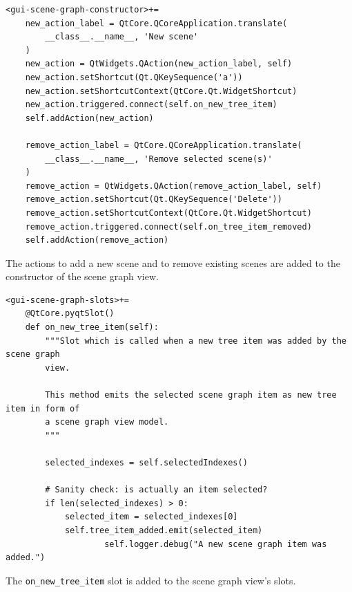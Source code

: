\documentclass[10pt, openright, notitlepage]{scrreprt}
\begin{document}
\begin{listing}[H]
\begin{verbatim}
<gui-scene-graph-constructor>+=
    new_action_label = QtCore.QCoreApplication.translate(
        __class__.__name__, 'New scene'
    )
    new_action = QtWidgets.QAction(new_action_label, self)
    new_action.setShortcut(Qt.QKeySequence('a'))
    new_action.setShortcutContext(QtCore.Qt.WidgetShortcut)
    new_action.triggered.connect(self.on_new_tree_item)
    self.addAction(new_action)
    
    remove_action_label = QtCore.QCoreApplication.translate(
        __class__.__name__, 'Remove selected scene(s)'
    )
    remove_action = QtWidgets.QAction(remove_action_label, self)
    remove_action.setShortcut(Qt.QKeySequence('Delete'))
    remove_action.setShortcutContext(QtCore.Qt.WidgetShortcut)
    remove_action.triggered.connect(self.on_tree_item_removed)
    self.addAction(remove_action)
\end{verbatim}
\caption{\label{lst:gui-scene-graph-constructor-01}
The actions to add a new scene and to remove existing scenes are added to the constructor of the scene graph view.}
\end{listing}

\begin{listing}[H]
\begin{verbatim}
<gui-scene-graph-slots>+=
    @QtCore.pyqtSlot()
    def on_new_tree_item(self):
        """Slot which is called when a new tree item was added by the scene graph
        view.
    
        This method emits the selected scene graph item as new tree item in form of
        a scene graph view model.
        """
    
        selected_indexes = self.selectedIndexes()
    
        # Sanity check: is actually an item selected?
        if len(selected_indexes) > 0:
            selected_item = selected_indexes[0]
            self.tree_item_added.emit(selected_item)
                    self.logger.debug("A new scene graph item was added.")
\end{verbatim}
\caption{\label{lst:gui-scene-graph-slots-on-tree-item-added}
The \texttt{on\_new\_tree\_item} slot is added to the scene graph view's slots.}
\end{listing}
\end{document}
